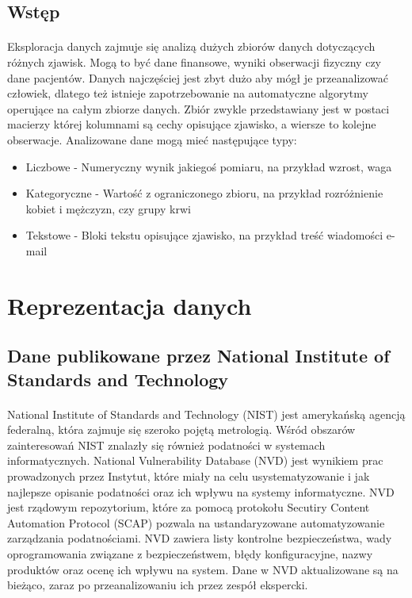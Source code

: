 \documentclass[a4paper,12pt,twoside]{article}
\begin{document}
\subsection{Wstęp}
\paragraph{}
Eksploracja danych zajmuje się analizą dużych zbiorów danych dotyczących różnych zjawisk. Mogą to być dane finansowe, wyniki obserwacji fizyczny czy dane pacjentów. Danych najczęściej jest zbyt dużo aby mógł je przeanalizować człowiek, dlatego też istnieje zapotrzebowanie na automatyczne algorytmy operujące na całym zbiorze danych. Zbiór zwykle przedstawiany jest w postaci macierzy której kolumnami są cechy opisujące zjawisko, a wiersze to kolejne obserwacje. Analizowane dane mogą mieć następujące typy:
\begin{itemize}
    \item Liczbowe - Numeryczny wynik jakiegoś pomiaru, na przykład wzrost, waga
    \item Kategoryczne - Wartość z ograniczonego zbioru, na przykład rozróżnienie kobiet i mężczyzn, czy grupy krwi
    \item Tekstowe - Bloki tekstu opisujące zjawisko, na przykład treść wiadomości e-mail 
\end{itemize}
\paragraph{}
\newpage
\thispagestyle{empty}
\mbox{}

\newpage
\section{Reprezentacja danych}
\subsection{Dane publikowane przez National Institute of Standards and Technology}
\paragraph{}
National Institute of Standards and Technology (NIST) jest amerykańską agencją federalną, która zajmuje się szeroko pojętą metrologią. Wśród obszarów zainteresowań NIST znalazły się również podatności w systemach informatycznych\cite{nist_official}. National Vulnerability Database (NVD) jest wynikiem prac prowadzonych przez Instytut, które miały na celu usystematyzowanie i jak najlepsze opisanie podatności oraz ich wpływu na systemy informatyczne. NVD jest rządowym repozytorium, które za pomocą protokołu Secutiry Content Automation Protocol (SCAP) pozwala na ustandaryzowane automatyzowanie zarządzania podatnościami. NVD zawiera listy kontrolne bezpieczeństwa, wady oprogramowania związane z bezpieczeństwem, błędy konfiguracyjne, nazwy produktów oraz ocenę ich wpływu na system. Dane w NVD aktualizowane są na bieżąco, zaraz po przeanalizowaniu ich przez zespół ekspercki\cite{nvd_official}. 
\end{document}

